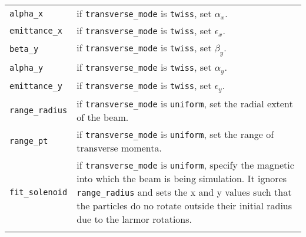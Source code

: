 \begin{table*}
\begin{center}
\begin{tabularx}{\linewidth}{lX}
\verb|alpha_x| & if \verb|transverse_mode| is \verb|twiss|, set $\alpha_x$.\\
\verb|emittance_x| & if \verb|transverse_mode| is \verb|twiss|, set $\epsilon_x$.\\
\verb|beta_y| & if \verb|transverse_mode| is \verb|twiss|, set $\beta_y$.\\
\verb|alpha_y| & if \verb|transverse_mode| is \verb|twiss|, set $\alpha_y$.\\
\verb|emittance_y| & if \verb|transverse_mode| is \verb|twiss|, set $\epsilon_y$.\\
\hline
\verb|range_radius| & if \verb|transverse_mode| is \verb|uniform|, set the radial extent of the beam.\\
\verb|range_pt| & if \verb|transverse_mode| is \verb|uniform|, set the range of transverse momenta.\\
\verb|fit_solenoid| & if \verb|transverse_mode| is \verb|uniform|, specify the magnetic into which the beam is being simulation. It ignores \verb|range_radius| and sets the x and y values such that the particles do no rotate outside their initial radius due to the larmor rotations.\\
\begin{makeimage} %
\end{makeimage} 
\end{tabularx}
\end{center}
\end{table*}


